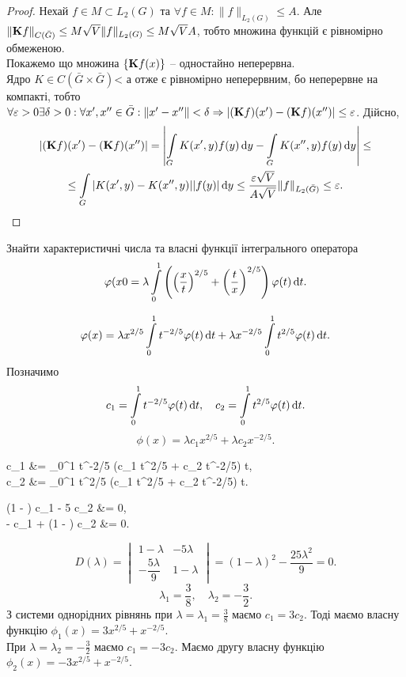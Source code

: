 \begin{proof}
	Нехай $f \in M \subset L_2(G)$ та $\forall f \in M: \|f\|_{L_2(G)} \le A$. Але $\|\bf{K} f\|_{C(\bar G)} \le M \sqrt{V} \|f\|_{L_2(G)} \le M \sqrt{V} A$, тобто множина функцій є рівномірно обмеженою. \\

	Покажемо що множина $\{ \bf{K}f(x)\}$ -- одностайно неперервна. \\

	Ядро $K \in C(\bar G \times \bar G)$< а отже є рівномірно неперервним, бо неперервне на компакті, тобто $\forall \epsilon > 0 \exists \delta > 0: \forall x', x'' \in \bar G: \|x' - x''\| < \delta \Rightarrow |(\bf{K}f)(x') - (\bf{K}f)(x'')| \le \epsilon$. Дійсно,
	\begin{multline*}
		|(\bf{K}f)(x') - (\bf{K}f)(x'')| = \left| \Int_G K(x', y) f(y) \diff y - \Int_G K(x'', y) f(y) \diff y \right| \le \\
		\le \Int_G |K(x', y) - K(x'', y)| |f(y)| \diff y \le \dfrac{\epsilon \sqrt{V}}{A \sqrt{V}} \|f\|_{L_2(\bar G)} \le \epsilon.
	\end{multline*}
\end{proof}

\begin{example}
	Знайти характеристичні числа та власні функції інтегрального оператора \[ \phi(x0 = \lambda \Int_0^1 \left( \left( \dfrac{x}{t} \right)^{2/5} + \left( \dfrac{t}{x} \right)^{2/5} \right) \phi(t) \diff t. \]
\end{example}
\begin{solution*}
	\[ \phi(x) = \lambda x^{2 / 5} \Int_0^1 t^{-2/5} \phi(t) \diff t + \lambda x^{-2/5} \Int_0^1 t^{2/5} \phi(t) \diff t. \]
	Позначимо
	\[ c_1 = \Int_0^1 t^{-2/5} \phi(t) \diff t, \quad c_2 = \Int_0^1 t^{2/5} \phi(t) \diff t. \]
	\[ \phi(x) = \lambda c_1 x^{2/5} + \lambda c_2 x^{-2/5}. \]
	\begin{system*}
		c_1 &= \Int_0^1 t^{-2/5} (\lambda c_1 t^{2/5} + \lambda c_2 t^{-2/5}) \diff t, \\
		c_2 &= \Int_0^1 t^{2/5} (\lambda c_1 t^{2/5} + \lambda c_2 t^{-2/5}) \diff t.
	\end{system*}
	\begin{system*}
		(1 - \lambda) c_1 - 5 \lambda c_2 &= 0, \\
		- c_1 + (1 - \lambda) c_2 &= 0.
	\end{system*}
	\[ D(\lambda) = \begin{vmatrix} 1 - \lambda & - 5 \lambda \\ - \dfrac{5\lambda}{9} & 1 - \lambda \end{vmatrix} = (1 - \lambda)^2 - \dfrac{25\lambda^2}{9} = 0. \]
	\[ \lambda_1 = \dfrac{3}{8}, \quad \lambda_2 = - \dfrac{3}{2}. \]
	З системи однорідних рівнянь при $\lambda = \lambda_1 = \frac{3}{8}$ маємо $c_1 = 3 c_2$. Тоді маємо власну функцію $\phi_1(x) = 3 x^{2 / 5} + x^{-2 / 5}$. \\

	При $\lambda = \lambda_2 = - \frac{3}{2}$ маємо $c_1 = - 3 c_2$. Маємо другу власну функцію $\phi_2(x) = - 3 x^{2 / 5} + x^{-2 / 5}$.
\end{solution*}

